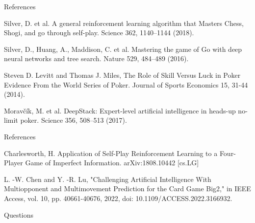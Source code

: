 \documentclass{beamer}
\begin{document}
\begin{frame}{References}
		\begin{thebibliography}{9}
			Silver, D. et al. A general reinforcement learning algorithm that Masters Chess, Shogi, and go through self-play. Science 362, 1140–1144 (2018). 
			
			Silver, D., Huang, A., Maddison, C. et al. Mastering the game of Go with deep neural networks and tree search. Nature 529, 484–489 (2016). 
			
			Steven D. Levitt and Thomas J. Miles,
			The Role of Skill Versus Luck in Poker Evidence From the World Series of Poker. Journal of Sports Economics 15, 31-44 (2014).
			
			Moravčík, M. et al. DeepStack: Expert-level artificial intelligence in heads-up no-limit poker. Science 356, 508–513 (2017). 
			
		\end{thebibliography}
\end{frame}
	
\begin{frame}{References}
	\begin{thebibliography}{9}
		\bibitem{big2ai}
		Charlesworth, H. Application of Self-Play Reinforcement Learning to a Four-Player Game of Imperfect Information. arXiv:1808.10442 [cs.LG]
		
		\bibitem{big2aitree}
		L. -W. Chen and Y. -R. Lu, "Challenging Artificial Intelligence With Multiopponent and Multimovement Prediction for the Card Game Big2," in IEEE Access, vol. 10, pp. 40661-40676, 2022, doi: 10.1109/ACCESS.2022.3166932.
	\end{thebibliography}
\end{frame}

\begin{frame}{Questions}
	
\end{frame}
\end{document}
